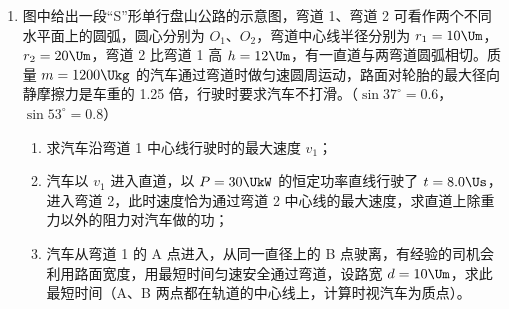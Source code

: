 \documentclass[\gkver]{gaokaozhenti}
\begin{document}
\begin{enumerate}
{	（3）游船行驶的总位移大小为 $x=\frac{0+v}{2}\Delta t_{1}+v\Delta t_{2}+\frac{v+v_{t}}{2}\Delta t_{3}=84\Um+4.2\times600\Um+\frac{4.2+0.2}{2}\times80\Um=2780\Um$，由平均速度的定义知 $\overline{v}=\frac{x}{t}=\frac{2780}{720}\Ums\approx3.86\Ums$。
}

\item
图中给出一段“S”形单行盘山公路的示意图，弯道 1、弯道 2 可看作两个不同水平面上的圆弧，圆心分别为 $O_{1}$、$O_{2}$，弯道中心线半径分别为 $r_{1}=10\Um$，$r_{2}=20\Um$，弯道 2 比弯道 1 高 $h=12\Um$，有一直道与两弯道圆弧相切。质量 $m=1200\Ukg$ 的汽车通过弯道时做匀速圆周运动，路面对轮胎的最大径向静摩擦力是车重的 1.25 倍，行驶时要求汽车不打滑。（$\sin37^\circ=0.6$，$\sin53^\circ=0.8$）

\begin{enumerate}
	\item
	求汽车沿弯道 1 中心线行驶时的最大速度 $v_{1}$；
	\item
	汽车以 $v_{1}$ 进入直道，以 $P=30\UkW$ 的恒定功率直线行驶了 $t=8.0\Us$，进入弯道 2，此时速度恰为通过弯道 2 中心线的最大速度，求直道上除重力以外的阻力对汽车做的功；
	\item
	汽车从弯道 1 的 A 点进入，从同一直径上的 B 点驶离，有经验的司机会利用路面宽度，用最短时间匀速安全通过弯道，设路宽 $d=10\Um$，求此最短时间（A、B 两点都在轨道的中心线上，计算时视汽车为质点）。
\end{enumerate}


\end{enumerate}
\end{document}
